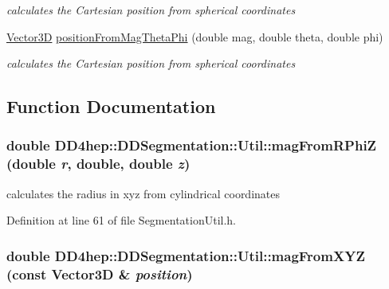 \begin{DoxyCompactItemize}
\begin{DoxyCompactList}\small\item\em calculates the Cartesian position from spherical coordinates \item\end{DoxyCompactList}\item 
\hyperlink{struct_d_d4hep_1_1_d_d_segmentation_1_1_vector3_d}{Vector3D} \hyperlink{namespace_d_d4hep_1_1_d_d_segmentation_1_1_util_a7856bceaaa7bcfa56ad6fe03ef007f8e}{positionFromMagThetaPhi} (double mag, double theta, double phi)
\begin{DoxyCompactList}\small\item\em calculates the Cartesian position from spherical coordinates \item\end{DoxyCompactList}\end{DoxyCompactItemize}


\subsection{Function Documentation}
\hypertarget{namespace_d_d4hep_1_1_d_d_segmentation_1_1_util_aa316184b02cf82f628558fc2f543d973}{
\subsubsection[{magFromRPhiZ}]{\setlength{\rightskip}{0pt plus 5cm}double DD4hep::DDSegmentation::Util::magFromRPhiZ (double {\em r}, \/  double, \/  double {\em z})}}
\label{namespace_d_d4hep_1_1_d_d_segmentation_1_1_util_aa316184b02cf82f628558fc2f543d973}


calculates the radius in xyz from cylindrical coordinates 

Definition at line 61 of file SegmentationUtil.h.\hypertarget{namespace_d_d4hep_1_1_d_d_segmentation_1_1_util_a696e414df89c2948f71d83861bb91f96}{
\subsubsection[{magFromXYZ}]{\setlength{\rightskip}{0pt plus 5cm}double DD4hep::DDSegmentation::Util::magFromXYZ (const Vector3D \& {\em position})}}
\label{namespace_d_d4hep_1_1_d_d_segmentation_1_1_util_a696e414df89c2948f71d83861bb91f96}


